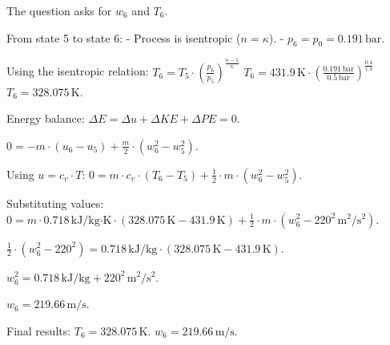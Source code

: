 The question asks for \( w_6 \) and \( T_6 \).  

From state 5 to state 6:  
- Process is isentropic (\( n = \kappa \)).  
- \( p_6 = p_0 = 0.191 \, \text{bar} \).  

Using the isentropic relation:  
\( T_6 = T_5 \cdot \left( \frac{p_6}{p_5} \right)^{\frac{\kappa - 1}{\kappa}} \)  
\( T_6 = 431.9 \, \text{K} \cdot \left( \frac{0.191 \, \text{bar}}{0.5 \, \text{bar}} \right)^{\frac{0.4}{1.4}} \)  
\( T_6 = 328.075 \, \text{K} \).  

Energy balance:  
\( \Delta E = \Delta u + \Delta KE + \Delta PE = 0 \).  

\( 0 = -m \cdot \left( u_6 - u_5 \right) + \frac{m}{2} \cdot \left( w_6^2 - w_5^2 \right) \).  

Using \( u = c_v \cdot T \):  
\( 0 = m \cdot c_v \cdot \left( T_6 - T_5 \right) + \frac{1}{2} \cdot m \cdot \left( w_6^2 - w_5^2 \right) \).  

Substituting values:  
\( 0 = m \cdot 0.718 \, \text{kJ/kg·K} \cdot \left( 328.075 \, \text{K} - 431.9 \, \text{K} \right) + \frac{1}{2} \cdot m \cdot \left( w_6^2 - 220^2 \, \text{m}^2/\text{s}^2 \right) \).  

\( \frac{1}{2} \cdot \left( w_6^2 - 220^2 \right) = 0.718 \, \text{kJ/kg} \cdot \left( 328.075 \, \text{K} - 431.9 \, \text{K} \right) \).  

\( w_6^2 = 0.718 \, \text{kJ/kg} + 220^2 \, \text{m}^2/\text{s}^2 \).  

\( w_6 = 219.66 \, \text{m/s} \).  

Final results:  
\( T_6 = 328.075 \, \text{K} \).  
\( w_6 = 219.66 \, \text{m/s} \).